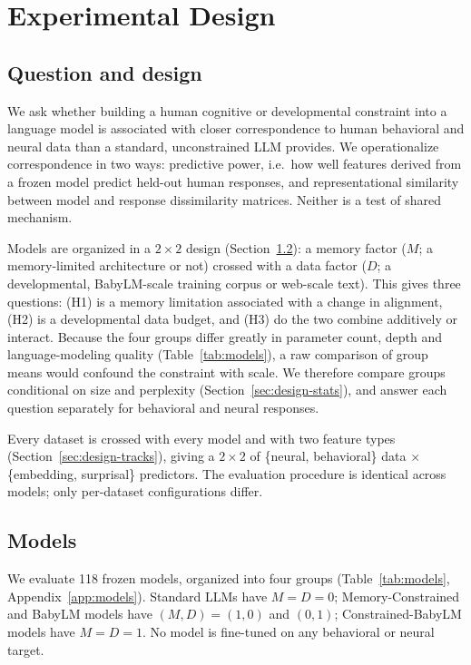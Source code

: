 \section{Experimental Design}
\label{sec:design}

\subsection{Question and design}
\label{sec:design-question}

We ask whether building a human cognitive or developmental constraint into a language model is associated with closer correspondence to human behavioral and neural data than a standard, unconstrained LLM provides. We operationalize correspondence in two ways: predictive power, i.e.\ how well features derived from a frozen model predict held-out human responses, and representational similarity between model and response dissimilarity matrices. Neither is a test of shared mechanism.

Models are organized in a $2\times2$ design (Section~\ref{sec:design-models}): a memory factor ($M$; a memory-limited architecture or not) crossed with a data factor ($D$; a developmental, BabyLM-scale training corpus or web-scale text). This gives three questions: (H1) is a memory limitation associated with a change in alignment, (H2) is a developmental data budget, and (H3) do the two combine additively or interact. Because the four groups differ greatly in parameter count, depth and language-modeling quality (Table~\ref{tab:models}), a raw comparison of group means would confound the constraint with scale. We therefore compare groups conditional on size and perplexity (Section~\ref{sec:design-stats}), and answer each question separately for behavioral and neural responses.

Every dataset is crossed with every model and with two feature types (Section~\ref{sec:design-tracks}), giving a $2\times2$ of \{neural, behavioral\} data $\times$ \{embedding, surprisal\} predictors. The evaluation procedure is identical across models; only per-dataset configurations differ.

\subsection{Models}
\label{sec:design-models}

We evaluate 118 frozen models, organized into four groups (Table~\ref{tab:models}, Appendix~\ref{app:models}). Standard LLMs have $M=D=0$; Memory-Constrained and BabyLM models have $(M,D)=(1,0)$ and $(0,1)$; Constrained-BabyLM models have $M=D=1$. No model is fine-tuned on any behavioral or neural target.

